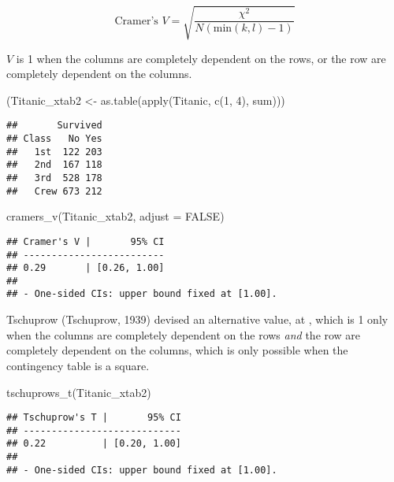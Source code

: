 \documentclass[
]{article}
\newenvironment{Shaded}{\begin{snugshade}}{\end{snugshade}}
\newcommand{\AttributeTok}[1]{\textcolor[rgb]{0.77,0.63,0.00}{#1}}
\newcommand{\ConstantTok}[1]{\textcolor[rgb]{0.00,0.00,0.00}{#1}}
\newcommand{\DecValTok}[1]{\textcolor[rgb]{0.00,0.00,0.81}{#1}}
\newcommand{\FunctionTok}[1]{\textcolor[rgb]{0.00,0.00,0.00}{#1}}
\newcommand{\NormalTok}[1]{#1}
\newcommand{\OtherTok}[1]{\textcolor[rgb]{0.56,0.35,0.01}{#1}}
\begin{document}
\[
\text{Cramer's } V = \sqrt{\frac{\chi^2}{N(\text{min}(k,l)-1)}}
\]

\(V\) is 1 when the columns are completely dependent on the rows, or the
row are completely dependent on the columns.

\begin{Shaded}
\begin{Highlighting}[]
\NormalTok{(Titanic\_xtab2 }\OtherTok{\textless{}{-}} \FunctionTok{as.table}\NormalTok{(}\FunctionTok{apply}\NormalTok{(Titanic, }\FunctionTok{c}\NormalTok{(}\DecValTok{1}\NormalTok{, }\DecValTok{4}\NormalTok{), sum)))}
\end{Highlighting}
\end{Shaded}

\begin{verbatim}
##       Survived
## Class   No Yes
##   1st  122 203
##   2nd  167 118
##   3rd  528 178
##   Crew 673 212
\end{verbatim}

\begin{Shaded}
\begin{Highlighting}[]
\FunctionTok{cramers\_v}\NormalTok{(Titanic\_xtab2, }\AttributeTok{adjust =} \ConstantTok{FALSE}\NormalTok{)}
\end{Highlighting}
\end{Shaded}

\begin{verbatim}
## Cramer's V |       95% CI
## -------------------------
## 0.29       | [0.26, 1.00]
## 
## - One-sided CIs: upper bound fixed at [1.00].
\end{verbatim}

Tschuprow (Tschuprow, 1939) devised an alternative value, at , which is
1 only when the columns are completely dependent on the rows \emph{and}
the row are completely dependent on the columns, which is only possible
when the contingency table is a square.

\begin{Shaded}
\begin{Highlighting}[]
\FunctionTok{tschuprows\_t}\NormalTok{(Titanic\_xtab2)}
\end{Highlighting}
\end{Shaded}

\begin{verbatim}
## Tschuprow's T |       95% CI
## ----------------------------
## 0.22          | [0.20, 1.00]
## 
## - One-sided CIs: upper bound fixed at [1.00].
\end{verbatim}
\end{document}
